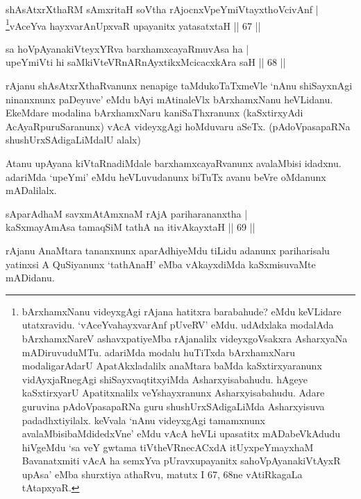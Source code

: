 \begin{shl}
shAsAtxrXthaRM sAmxritaH soV\s tha rAjocnxVpeYmiVtayxthoVcivAnf | \\
\footnote{bArxhamxNanu videyxgAgi rAjana hatitxra barabahude? eMdu  keVLidare utatxravidu. `vAceYva\break hayxvarAnf pUveRV' eMdu. udAdxlaka  modalAda bArxhamxNareV ashavxpatiyeMba rAjanalilx videyxgoVsakxra  AsharxyaNa mADiruvuduMTu. adariMda modalu huTiTxda bArxhamxNaru  modaligarAdarU ApatAkxladalilx anaMtara baMda kaSxtirxyaranunx  vidAyxjaRnegAgi shiSayxvaqtitxyiMda Asharxyisabahudu. hAgeye  kaSxtirxyarU Apatitxnalilx veYshayxranunx Asharxyisabahudu. Adare  guruvina pAdoVpasapaRNa guru shushUrxSAdigaLiMda Asharxyisuva  padadhxtiyilalx. keVvala `nAnu videyxgAgi tamamxnunx avalaMbisi\break baMdidedxVne' eMdu vAcA heVLi upasatitx mADabeVkAdudu hiVgeMdu  `sa veY gwtama tiVtheVRnecACxdA itUyxpeYmayxhaM Bavanatxmiti vAcA ha semxYva pUravxupayanitx sahoVpAyanakiVtAyxR upAsa' eMba shurxtiya athaRvu, matutx I 67, 68ne vAtiRkagaLa tAtapxyaR.}vAceYva hayxvarAnUpxvaR upayanitx yatasatxtaH \hfill|| 67 || 
\end{shl}


\begin{shl}
sa hoVpAyanakiVteyxYRva barxhamxcayaRmuvAsa ha | \\
upeYmiVti hi saMkiVteVRnARnAyxtikxMcicacxkAra saH \hfill|| 68 ||  
\end{shl}

\begin{artha}
rAjanu shAsAtxrXthaRvanunx nenapige taMdukoTaTxmeVle `nAnu shiSayxnAgi ninanxnunx paDeyuve' eMdu bAyi mAtinaleVlx bArxhamxNanu heVLidanu. EkeMdare modalina bArxhamxNaru kaniSaThxranunx (kaSxtirxyAdi AcAyaRpuruSaranunx) vAcA videyxgAgi hoMduvaru aSeTx. (pAdoVpasapaRNa shushUrxSAdigaLiMdalU alalx)

Atanu upAyana kiVtaRnadiMdale barxhamxcayaRvanunx avalaMbisi idadxnu. adariMda `upeYmi' eMdu heVLuvudanunx biTuTx avanu beVre oMdanunx mADalilalx.
\end{artha}

\begin{shl}
sAparAdhaM savxmAtAmxnaM rAjA pariharananxtha | \\
kaSxmayAmAsa tamaqSiM tathA na itivAkayxtaH \hfill|| 69 || 
\end{shl}

\begin{artha}
rAjanu AnaMtara tananxnunx aparAdhiyeMdu tiLidu adanunx pariharisalu yatinxsi A QuSiyanunx `tathAnaH' eMba vAkayxdiMda kaSxmisuvaMte mADidanu.
\end{artha}


